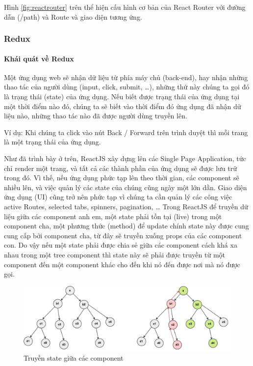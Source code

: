 Hình \ref{fig:reactrouter} trên thể hiện cấu hình 
cơ bản của React Router với
đường dẫn (/path) và Route và giao diện tương ứng.

\subsubsection{Redux}
\paragraph{Khái quát về Redux}
Một ứng dụng web sẽ nhận dữ liệu từ phía máy chủ (back-end),
hay nhận những thao tác của người dùng (input, click, submit, …),
những thứ này chúng ta gọi đó là trạng thái (state) của ứng dụng.
Nếu biết được trạng thái của ứng dụng tại một thời điểm nào đó,
chúng ta sẽ biết vào thời điểm đó ứng dụng đã nhận dữ liệu nào,
những thao tác nào đã được người dùng truyền lên.

Ví dụ: Khi chúng ta click vào nút Back / Forward trên trình duyệt 
thì mỗi trang là một trạng thái của ứng dụng.

Như đã trình bày ở trên, ReactJS xây dựng lên các Single
Page Application, tức chỉ render một trang, và tất cả các
thành phần của ứng dụng sẽ được lưu trữ trong đó. Vì thế,
nếu ứng dụng phức tạp lên theo thời gian, các component sẽ nhiều
lên, và việc quản lý các state của chúng cũng ngày một lớn dần.
Giao diện ứng dụng (UI) cũng trở nên phức tạp vì chúng ta
cần quản lý các công việc active Routes, selected tabs, spinners,
pagination, … Trong ReactJS để truyền dữ liệu giữa các component anh
em, một state phải tồn tại (live) trong một component cha,
một phương thức (method) để update chính state này được cung cung
cấp bởi component cha, từ đây sẽ truyền xuống props của các
component con. Do vậy nếu một state phải được chia sẻ giữa các
component cách khá xa nhau trong một tree component thì state
này sẽ phải được truyền từ một component đến một component khác cho
đến khi nó đến được nơi mà nó được gọi.

\begin{figure}[H]
\centering
\includegraphics[width=16cm]{images/redux-state-transfer.png}
\caption{Truyền state giữa các component}
\end{figure}

